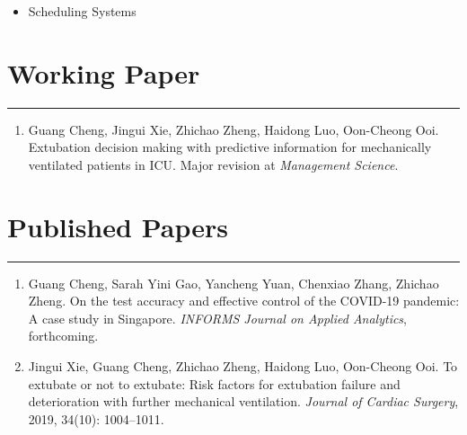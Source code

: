 \documentclass[12pt, a4paper]{article}
\begin{document}
{\begin{itemize}[leftmargin=36pt, itemsep=6pt, parsep=0.2pt, topsep=1pt]
	\item Scheduling Systems

\end{itemize}




\section*{Working Paper}
\vspace*{0.4em}
\hrule height 0.5pt
\begin{enumerate}[leftmargin=36pt, itemsep=6pt, parsep=0.2pt, topsep=1pt]

	\item Guang Cheng, Jingui Xie, Zhichao Zheng, Haidong Luo, Oon-Cheong Ooi.
	Extubation decision making with predictive information for mechanically ventilated patients in ICU.
	Major revision at {\it Management Science}.

\end{enumerate}




\section*{Published Papers}
\vspace*{0.4em}
\hrule height 0.5pt
\begin{enumerate}[leftmargin=36pt, itemsep=6pt, parsep=0.2pt, topsep=1pt]

	\item Guang Cheng, Sarah Yini Gao, Yancheng Yuan, Chenxiao Zhang, Zhichao Zheng. 
	On the test accuracy and effective control of the COVID-19 pandemic: A case study in Singapore. 
	{\it INFORMS Journal on Applied Analytics}, forthcoming.

	\item Jingui Xie, Guang Cheng, Zhichao Zheng, Haidong Luo, Oon-Cheong Ooi. 
	To extubate or not to extubate: Risk factors for extubation failure and deterioration with further mechanical ventilation. 
	{\it Journal of Cardiac Surgery}, 2019, 34(10): 1004–1011. 


\end{enumerate}}
\end{document}
